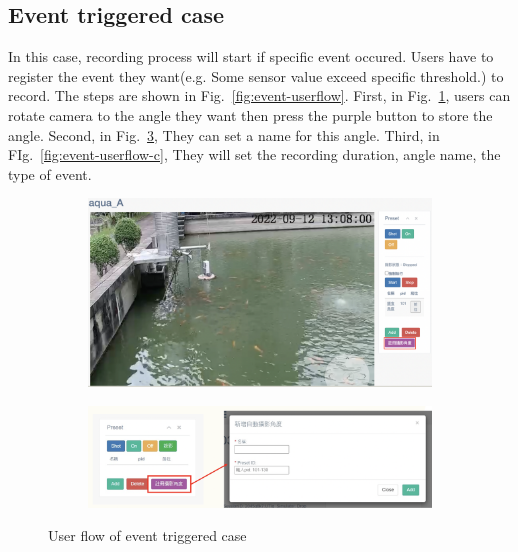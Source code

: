 \subsection{Event triggered case}
In this case, recording process will start if specific event occured. Users have to register the event they want(e.g. Some sensor value exceed specific threshold.) to record. The steps are shown in Fig.~\ref{fig:event-userflow}. First, in Fig.~\ref{fig:event-userflow-a}, users can rotate camera to the angle they want then press the purple button to store the angle. Second, in Fig.~\ref{fig:event-userflow-b}, They can set a name for this angle. Third, in FIg.~\ref{fig:event-userflow-c}, They will set the recording duration, angle name, the type of event.

\begin{figure}[H]
    \centering
    \begin{subfigure}{\textwidth}
        \includegraphics[width=\textwidth]{figsrc/event-userflow-a.png}
        \label{fig:event-userflow-a}
    \end{subfigure}

\medskip
    \begin{subfigure}{\textwidth}
        \includegraphics[width=\textwidth]{figsrc/event-userflow-b.png}
        \label{fig:event-userflow-b}
    \end{subfigure}
    \caption{User flow of event triggered case}
\end{figure}

